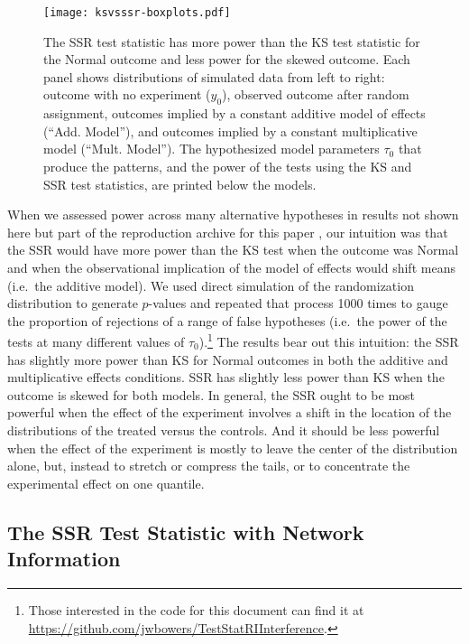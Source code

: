 \begin{figure}[H]\centering
  \texttt{[image: ksvsssr-boxplots.pdf]}
  \caption{The SSR test statistic has more power than the KS test statistic for the Normal outcome and
    less power for the skewed outcome. Each panel shows distributions of simulated data from left to right:
    outcome with no experiment ($y_0$), observed outcome after random assignment,
    outcomes implied by a constant additive model of effects (``Add. Model''),
    and outcomes implied by a constant multiplicative model (``Mult. Model''). The hypothesized model parameters $\tau_0$ that
    produce the patterns, and the power of the tests using the KS and SSR test
    statistics, are printed below the models.}\label{fig:boxplot}
\end{figure}

When we assessed power across many alternative hypotheses in results not shown
here but part of the reproduction archive
for this paper \citep{bowers2016dataverse}, our intuition was
that the SSR would have more power than the KS test when the outcome was
Normal and when the observational implication of the model of effects would
shift means (i.e.\ the additive model). We used direct simulation of the
randomization distribution to generate $p$-values and repeated that process
1000 times to gauge the proportion of rejections of a range of false
hypotheses  (i.e.\ the power of the tests at many different values of
$\tau_0$).\footnote{Those interested in the code for this document can find it
at \url{https://github.com/jwbowers/TestStatRIInterference}. } The results bear out this intuition: the SSR has slightly more power than
KS for Normal outcomes in both the additive and multiplicative effects
conditions. SSR has slightly less power than KS when the outcome is skewed for
both models. In general, the SSR ought to be most powerful when the effect of
the experiment involves a shift in the location of the distributions of the
treated versus the controls. And it should be less powerful when the effect of
the experiment is mostly to leave the center of the distribution alone, but,
instead to stretch or compress the tails, or to concentrate the experimental
effect on one quantile.

\subsection{The SSR Test Statistic with Network Information}

